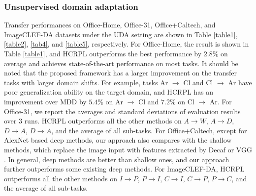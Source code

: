 \documentclass[a4paper,fleqn]{cas-dc}
\begin{document}
	\subsubsection{Unsupervised domain adaptation} Transfer performances on Office-Home, Office-31, Office+Caltech, and  ImageCLEF-DA datasets under the UDA setting are shown in Table \ref{table1}, \ref{table2}, \ref{tab4}, and \ref{table5}, respectively. For Office-Home, the result is shown in Table \ref{table1}, and HCRPL outperforms the best performance by $2.8\%$ on average and achieves state-of-the-art performance on most tasks. It should be noted that the proposed framework has a larger improvement on the transfer tasks with larger domain shifts. For example, tasks Ar $\rightarrow$ Cl and  Cl $\rightarrow$ Ar have poor generalization ability on the target domain, and HCRPL has an improvement over MDD by $5.4\%$ on Ar $\rightarrow$ Cl and $7.2\%$ on Cl $\rightarrow$ Ar. For Office-31, we report the averages and standard deviations of evaluation results over 3 runs. HCRPL outperforms all the other methods on $A \rightarrow W$, $A \rightarrow D$, $D \rightarrow A$, $D \rightarrow A$, and the average of all sub-tasks. {For Office+Caltech, except for AlexNet based deep methods, our approach also compares with the shallow methods, which replace the image input with features extracted by Decaf \cite{Donahue2014DeCAFAD} or VGG \cite{simonyan2014very}.  In general, deep methods are better than shallow ones, and our approach further outperforms some existing deep methods.}  For ImageCLEF-DA, HCRPL outperforms all the other methods on $I \rightarrow P$, $P \rightarrow I$, $C \rightarrow I$, $C \rightarrow P$, $P \rightarrow C$, and the average of all sub-tasks.
	
	
	
	
	
\end{document}
